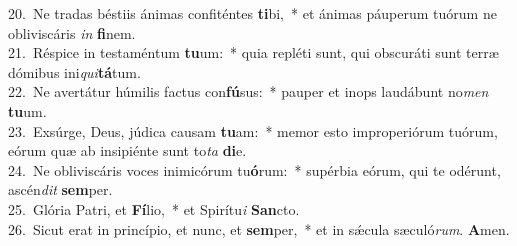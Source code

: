 {20.~}Ne tradas béstiis ánimas confiténtes \textbf{ti}bi,~* et ánimas páuperum tuórum ne obliviscáris \textit{in} \textbf{fi}nem.\\
{21.~}Réspice in testaméntum \textbf{tu}um:~* quia repléti sunt, qui obscuráti sunt terræ dómibus ini\textit{qui}\textbf{tá}tum.\\
{22.~}Ne avertátur húmilis factus con\textbf{fú}sus:~* pauper et inops laudábunt no\textit{men} \textbf{tu}um.\\
{23.~}Exsúrge, Deus, júdica causam \textbf{tu}am:~* memor esto improperiórum tuórum, eórum quæ ab insipiénte sunt to\textit{ta} \textbf{di}e.\\
{24.~}Ne obliviscáris voces inimicórum tu\textbf{ó}rum:~* supérbia eórum, qui te odérunt, ascén\textit{dit} \textbf{sem}per.\\
{25.~}Glória Patri, et \textbf{Fí}lio,~* et Spirítu\textit{i} \textbf{San}cto.\\
{26.~}Sicut erat in princípio, et nunc, et \textbf{sem}per,~* et in sǽcula sæculó\textit{rum}. \textbf{A}men.\\
